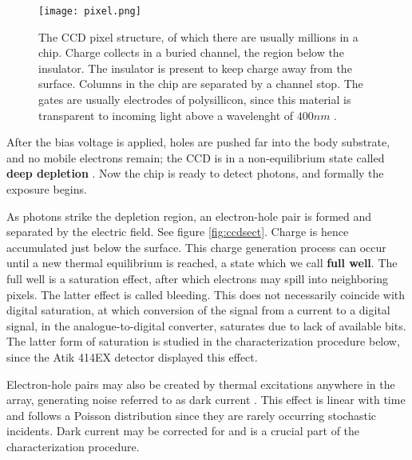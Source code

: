 \documentclass[../main.tex]{subfiles}
\begin{document}
	\begin{figure}[h!]
		\centering
		\texttt{[image: pixel.png]}
		\caption{The CCD pixel structure\cite{teledyneart}, of which there are usually millions in a chip\cite{teledyneart}. Charge collects in a buried channel, the region below the insulator. The insulator is present to keep charge away from the surface. Columns in the chip are separated by a channel stop\cite{teledyneart}. The gates are usually electrodes of polysillicon\cite{teledyneart}, since this material is transparent to incoming light above a wavelenght of $400nm$ \cite{teledyneart}. 
		}
		\label{fig:pixel}
	\end{figure}
	
	After the bias voltage is applied, holes are pushed far into the body substrate, and no mobile electrons remain; the CCD is in a non-equilibrium state called \textbf{deep depletion} \cite{CCDbook}. Now the chip is ready to detect photons, and formally the exposure begins. 
	
	As photons strike the depletion region, an electron-hole pair is formed and separated by the electric field. See figure \ref{fig:ccdsect}. Charge is hence accumulated just below the surface. This charge generation process can occur until a new thermal equilibrium is reached, a state which we call \textbf{full well}. The full well is a saturation effect, after which electrons may spill into neighboring pixels. The latter effect is called bleeding. This does not necessarily coincide with digital saturation, at which conversion of the signal from a current to a digital signal, in the analogue-to-digital converter, saturates due to lack of available bits. The latter form of saturation is studied in the characterization procedure below, since the Atik 414EX detector displayed this effect.
	
	Electron-hole pairs may also be created by thermal excitations anywhere in the array, generating noise referred to as dark current \cite{CCDdatareductionguide}. This effect is linear with time and follows a Poisson distribution\cite{CCDdatareductionguide} since they are rarely occurring stochastic incidents. Dark current may be corrected for and is a crucial part of the characterization procedure.  
	
\end{document}

